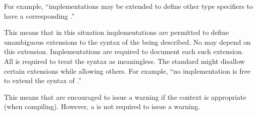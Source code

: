 For example, ``implementations may be extended to define other type
specifiers to have a corresponding .''


This means that in this situation implementations are permitted to
define unambiguous extensions to the syntax of the  being
described.  No  may depend on this extension.
Implementations are required to document each such extension. All
 is required to treat the syntax as meaningless. The
standard might disallow certain extensions while allowing others. For
example, ``no implementation is free to extend the syntax of
.''
                          
         
This means that  are encouraged to issue a warning
if the context is appropriate (\eg when compiling).  However, a
 is not required to issue a warning.

%                        
% 

